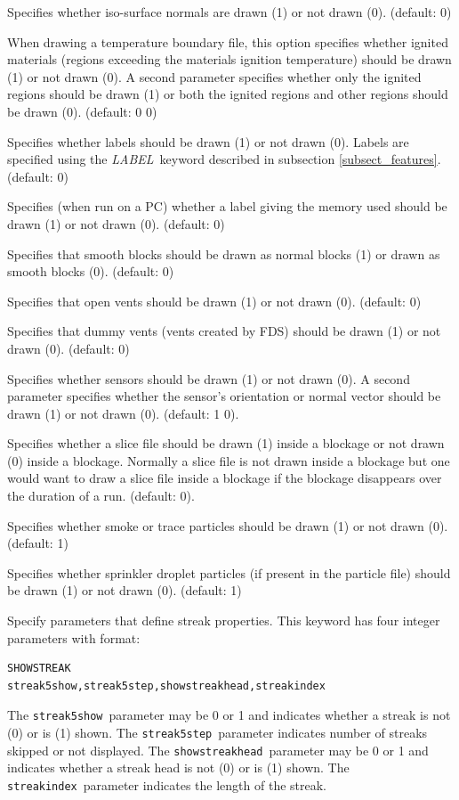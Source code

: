 \documentclass[11pt,twoside]{book}
\newcommand{\hitem}[1]{\item[{\bf #1} \hfill]}
\begin{document}
\hitem{SHOWISONORMALS} Specifies whether iso-surface normals are drawn
(1) or not drawn (0).  (default: 0)

\hitem{SHOWIGNITION} When drawing a temperature boundary file, this option
specifies whether ignited materials (regions exceeding the materials
ignition temperature) should be drawn (1) or not drawn (0).
A second parameter specifies whether only the ignited regions
should be drawn (1) or both the ignited regions and other regions should be drawn (0).
(default: 0 0)


\hitem{SHOWLABELS}Specifies whether labels should be drawn (1) or
not drawn (0).  Labels are specified using the {\em LABEL}\
keyword described in subsection \ref{subsect_features}. (default:
0)

\hitem{SHOWMEMLOAD} Specifies (when run on a PC) whether a label
giving the memory used should be drawn (1) or not drawn (0).
(default: 0)

\hitem{SHOWNORMALWHENSMOOTH} Specifies that smooth blocks
should be drawn as normal blocks (1) or drawn as smooth
blocks (0). (default: 0)

\hitem{SHOWOPENVENTS} Specifies that open vents should be drawn
(1) or not drawn (0).  (default: 0)

\hitem{SHOWDUMMYVENTS} Specifies that dummy vents (vents created
by FDS) should be drawn (1) or not drawn (0).  (default: 0)

\hitem{SHOWSENSORS} Specifies whether sensors should be drawn (1) or not drawn (0).
A second parameter specifies whether the sensor's orientation or normal vector
should be drawn (1) or not drawn (0). (default: 1 0).

\hitem{SHOWSLICEINOBST} Specifies whether a slice file should be drawn (1) inside
a blockage or not drawn (0) inside a blockage.  Normally a slice file
is not drawn inside a blockage but one would want to draw a
slice file inside a blockage if the blockage disappears over the
duration of a run.  (default: 0).


\hitem{SHOWSMOKEPART}Specifies whether smoke or trace particles
should be drawn (1) or not drawn (0). (default: 1)

\hitem{SHOWSPRINKPART}Specifies whether
sprinkler droplet particles (if present in the particle file)
should be drawn (1) or not drawn (0).
(default: 1)

\hitem{SHOWSTREAK}Specify parameters that define streak properties.  This keyword
has four integer parameters with format:
\begin{lstlisting}
SHOWSTREAK
streak5show,streak5step,showstreakhead,streakindex
\end{lstlisting}
The {\tt streak5show}\ parameter may be 0 or 1 and indicates whether a
streak is not (0) or is (1) shown. The {\tt streak5step}\ parameter
indicates number of streaks skipped or not displayed.
The {\tt showstreakhead}\ parameter may be 0 or 1 and indicates
whether a streak head is not (0) or is (1) shown.
The {\tt streakindex}\ parameter indicates the length of the streak.
\end{document}

